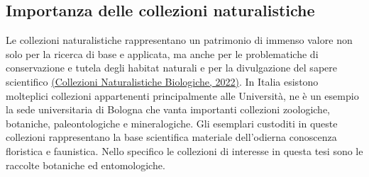 \documentclass[main.tex]{subfiles}
\begin{document}
\subsection{Importanza delle collezioni naturalistiche}

Le collezioni naturalistiche rappresentano un patrimonio di immenso valore non solo per la ricerca di base e applicata, ma anche per le problematiche di conservazione e tutela degli habitat naturali e per la divulgazione del sapere scientifico \href{https://www.isprambiente.gov.it/it/attivita/museo/collezioni-naturalistiche-biologiche}{(Collezioni Naturalistiche Biologiche, 2022)}.
In Italia esistono molteplici collezioni appartenenti principalmente alle Università, ne è un esempio la sede universitaria di Bologna che vanta importanti collezioni zoologiche, botaniche, paleontologiche e mineralogiche. Gli esemplari custoditi in queste collezioni rappresentano la base scientifica materiale dell’odierna conoscenza floristica e faunistica. Nello specifico le collezioni di interesse in questa tesi sono le raccolte botaniche ed entomologiche.
\end{document}
